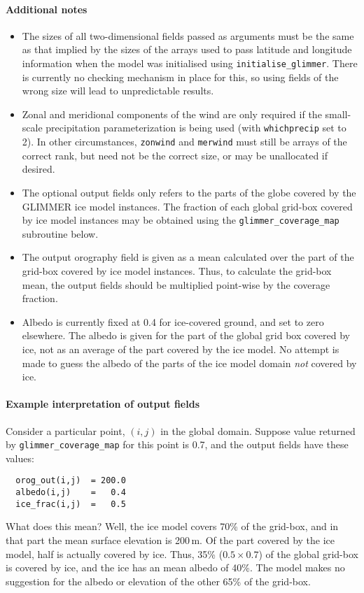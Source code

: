 \documentclass[11pt]{article}
\begin{document}
\paragraph{Additional notes}
%
\begin{itemize}
\item The sizes of all two-dimensional fields passed as arguments must be the
  same as that implied by the sizes of the arrays used to pass latitude and
  longitude information when the model was initialised using
  \texttt{initialise\_glimmer}. There is
  currently no checking mechanism in place for this, so using fields of the wrong size
  will lead to unpredictable results.
\item Zonal and meridional components of the wind are only required if the
  small-scale precipitation parameterization is being used (with
  \texttt{whichprecip} set to 2). In other circumstances, \texttt{zonwind} and
  \texttt{merwind} must still be arrays of the correct rank, but need not be
  the correct size, or may be unallocated if desired.
\item The optional output fields only refers to the parts of the globe
  covered by the GLIMMER ice model instances. The fraction of each global
  grid-box covered by ice model instances may be obtained using the
  \texttt{glimmer\_coverage\_map} subroutine below. 
\item The output orography field is given as a mean calculated over the part
  of the grid-box covered by ice  model instances. Thus, to calculate the
  grid-box mean, the output fields should be multiplied point-wise by the
  coverage fraction. 
\item Albedo is currently fixed at 0.4 for ice-covered ground, and set to zero
  elsewhere. The albedo is given for the part of the global grid box covered
  by ice, not as an average of the part covered by the ice model. No attempt
  is made to guess the albedo of the parts of the ice model domain \emph{not}
  covered by ice.
\end{itemize}
%
\paragraph{Example interpretation of output fields}
%
Consider a particular point, $(i,j)$ in the global domain. Suppose value
returned by \texttt{glimmer\_coverage\_map} for this point is 0.7, and the
output fields have these values:
\begin{verbatim}
  orog_out(i,j)  = 200.0
  albedo(i,j)    =   0.4
  ice_frac(i,j)  =   0.5
\end{verbatim}
%
What does this mean? Well, the ice model covers 70\% of the grid-box, and in
that part the mean surface elevation is 200\,m. Of the part covered by the ice
model, half is actually covered by ice. Thus, 35\% ($0.5\times 0.7$) of the global grid-box is
covered by ice, and the ice has an mean albedo of 40\%. The model makes no suggestion for the
albedo or elevation of the other 65\% of the grid-box.
%
\end{document}
